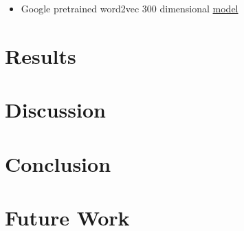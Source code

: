 \documentclass[sigconf,authordraft]{acmart}
\begin{document}
\begin{itemize}
    \item Google pretrained word2vec 300 dimensional \href{
https://www.kaggle.com/datasets/leadbest/googlenewsvectorsnegative300}{model}
\end{itemize}
\section{Results}

\section{Discussion}

\section{Conclusion}

\section{Future Work}


\begin{acks}
\end{acks}




\appendix
\end{document}
